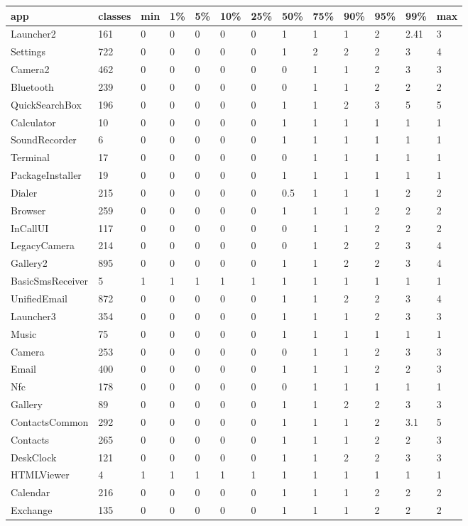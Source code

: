 \begin{tabular}{|l|l|l|l|l|l|l|l|l|l|l|l|l|}
\hline
app&classes&min&1\%&5\%&10\%&25\%&50\%&75\%&90\%&95\%&99\%&max\\
\hline
Launcher2&161&0&0&0&0&0&1&1&1&2&2.41&3\\
\hline
Settings&722&0&0&0&0&0&1&2&2&2&3&4\\
\hline
Camera2&462&0&0&0&0&0&0&1&1&2&3&3\\
\hline
Bluetooth&239&0&0&0&0&0&0&1&1&2&2&2\\
\hline
QuickSearchBox&196&0&0&0&0&0&1&1&2&3&5&5\\
\hline
Calculator&10&0&0&0&0&0&1&1&1&1&1&1\\
\hline
SoundRecorder&6&0&0&0&0&0&1&1&1&1&1&1\\
\hline
Terminal&17&0&0&0&0&0&0&1&1&1&1&1\\
\hline
PackageInstaller&19&0&0&0&0&0&1&1&1&1&1&1\\
\hline
Dialer&215&0&0&0&0&0&0.5&1&1&1&2&2\\
\hline
Browser&259&0&0&0&0&0&1&1&1&2&2&2\\
\hline
InCallUI&117&0&0&0&0&0&0&1&1&2&2&2\\
\hline
LegacyCamera&214&0&0&0&0&0&0&1&2&2&3&4\\
\hline
Gallery2&895&0&0&0&0&0&1&1&2&2&3&4\\
\hline
BasicSmsReceiver&5&1&1&1&1&1&1&1&1&1&1&1\\
\hline
UnifiedEmail&872&0&0&0&0&0&1&1&2&2&3&4\\
\hline
Launcher3&354&0&0&0&0&0&1&1&1&2&3&3\\
\hline
Music&75&0&0&0&0&0&1&1&1&1&1&1\\
\hline
Camera&253&0&0&0&0&0&0&1&1&2&3&3\\
\hline
Email&400&0&0&0&0&0&1&1&1&2&2&3\\
\hline
Nfc&178&0&0&0&0&0&0&1&1&1&1&1\\
\hline
Gallery&89&0&0&0&0&0&1&1&2&2&3&3\\
\hline
ContactsCommon&292&0&0&0&0&0&1&1&1&2&3.1&5\\
\hline
Contacts&265&0&0&0&0&0&1&1&1&2&2&3\\
\hline
DeskClock&121&0&0&0&0&0&1&1&2&2&3&3\\
\hline
HTMLViewer&4&1&1&1&1&1&1&1&1&1&1&1\\
\hline
Calendar&216&0&0&0&0&0&1&1&1&2&2&2\\
\hline
Exchange&135&0&0&0&0&0&1&1&1&2&2&2\\
\hline
\end{tabular}
